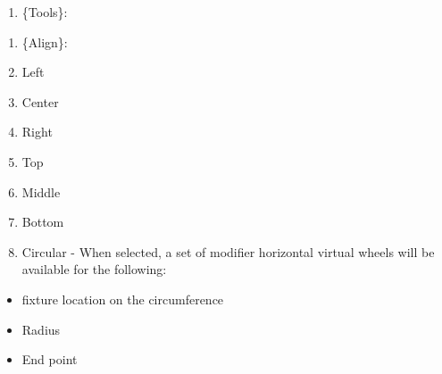 \documentclass[
]{article}
\providecommand{\tightlist}{%
  \setlength{\itemsep}{0pt}\setlength{\parskip}{0pt}}
\begin{document}
\begin{enumerate}
\def\labelenumi{\alph{enumi}.}
\setcounter{enumi}{2}
\tightlist
\item
  \{Tools\}:
\end{enumerate}

\begin{enumerate}
\def\labelenumi{\arabic{enumi}.}
\item
  \{Align\}:
\item
  Left
\item
  Center
\item
  Right
\item
  Top
\item
  Middle
\item
  Bottom
\item
  Circular - When selected, a set of modifier horizontal virtual wheels will be available for the following:
\end{enumerate}

\begin{itemize}
\item
  fixture location on the circumference
\item
  Radius
\item
  End point
\end{itemize}
\end{document}

